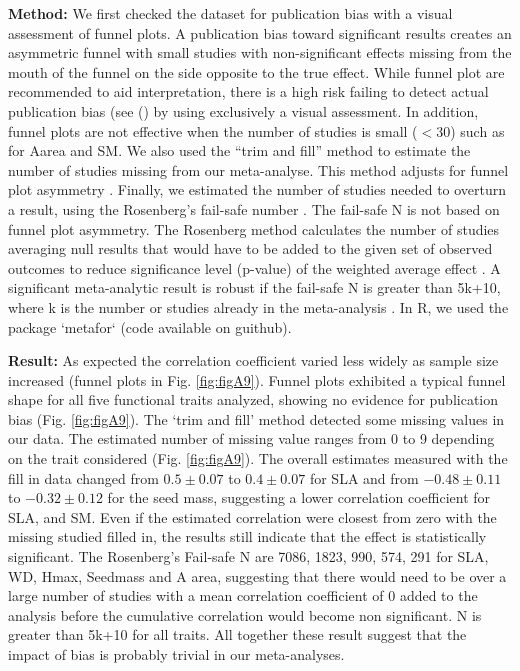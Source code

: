 \documentclass[a4paper]{article}\usepackage[]{graphicx}\usepackage[]{color}
\begin{document}
\begin{appendices}
\textbf{Method:} We first checked the dataset for publication bias with a visual assessment of funnel plots. A publication bias toward significant results creates an asymmetric funnel with small studies with non-significant effects missing from the mouth of the funnel on the side opposite to the true effect. While funnel plot are recommended to aid interpretation, there is a high risk failing to detect actual publication bias (see (\citealt{Koricheva:2013tz}) by using exclusively a visual assessment. In addition, funnel plots are not effective when the number of studies is small ($<30$) such as for Aarea and SM.
We also used the ``trim and fill'' method to estimate the number of studies missing from our meta-analyse. This method adjusts for funnel plot asymmetry \citep{Duval:2000dg}.
Finally, we estimated the number of studies needed to overturn a result, using the Rosenberg’s fail-safe number \citep{Rosenberg:2005hk}. The fail-safe N is not based on funnel plot asymmetry. The Rosenberg method calculates the number of studies averaging null results that would have to be added to the given set of observed outcomes to reduce significance level (p-value) of the weighted average effect \citep{Rosenberg:2005hk}. A significant meta-analytic result is robust if the fail-safe N is greater than 5k+10, where k is the number or studies already in the meta-analysis \citep{Rosenthal:1979do}.
In R, we used the package `metafor` (code available on guithub).

\textbf{Result:} As expected the correlation coefficient varied less widely as sample size increased (funnel plots in Fig. \ref{fig:figA9}). Funnel plots exhibited a typical funnel shape for all five functional traits analyzed, showing no evidence for publication bias (Fig. \ref{fig:figA9}).
The ‘trim and fill’ method detected some missing values in our data. The estimated number of missing value ranges from 0 to 9 depending on the trait considered (Fig. \ref{fig:figA9}). The overall estimates measured with the fill in data changed from $0.5 \pm 0.07$  to $0.4 \pm 0.07$  for SLA and from $-0.48 \pm 0.11$  to $-0.32 \pm 0.12$  for the seed mass, suggesting a lower correlation coefficient for SLA, and SM. Even if the estimated correlation were closest from zero with the missing studied filled in, the results still indicate that the effect is statistically significant.
The Rosenberg’s Fail-safe N are 7086, 1823, 990, 574, 291 for SLA, WD, Hmax, Seedmass and A area, suggesting that there would need to be over a large number of studies with a mean correlation coefficient of 0 added to the analysis before the cumulative correlation would become non significant. N is greater than 5k+10 for all traits.
All together these result suggest that the impact of bias is probably trivial in our meta-analyses.


\end{appendices}
\end{document}
